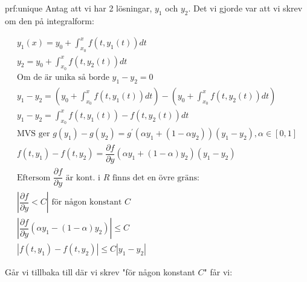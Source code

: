 \begin{prf}{prf:unique}
  Antag att vi har 2 lösningar, $y_1$ och $y_2$. Det vi gjorde var att vi skrev om den på integralform:


  \begin{equation*}
    \begin{gathered}
      y_1(x)=y_0+\int_{x_0}^{x}f(t,y_1(t))dt\\
      y_2 =y_0+\int_{x_0}^{x}f(t,y_2(t))dt\\
      \text{Om de är unika så borde } y_1-y_2=0\\
      y_1-y_2=\left(y_0+\int_{x_0}^{x}f(t,y_1(t))dt\right)-\left(y_0+\int_{x_0}^{x}f(t,y_2(t))dt\right)\\
      y_1-y_2 = \int_{x_0}^{x}f(t,y_1(t))-f(t,y_2(t)) dt\\
      \text{MVS ger } g(y_1)-g(y_2)=g^{\prime}(\alpha y_1+(1-\alpha y_2))(y_1-y_2), \alpha\in [0,1]\\
      f(t,y_1)-f(t,y_2)=\dfrac{\partial f}{\partial y}(\alpha y_1+(1-\alpha)y_2)(y_1-y_2)\\
      \text{Eftersom $\dfrac{\partial f}{\partial y}$ är kont. i $R$ finns det en övre gräns:}\\
      \left|\dfrac{\partial f}{\partial y}< C\right| \text{ för någon konstant $C$}\\
      \left|\dfrac{\partial f}{\partial y}(\alpha y_1-(1-\alpha)y_2)\right| \leq C\\
      \left|f(t,y_1)-f(t,y_2)\right|\leq C\left|y_1-y_2\right|
    \end{gathered}
  \end{equation*}
  \par\bigskip
  Går vi tillbaka till där vi skrev "för någon konstant $C$" får vi:



\end{prf}

